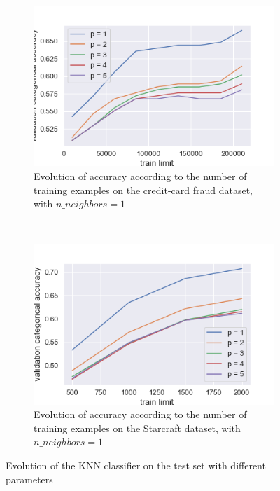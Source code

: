 \documentclass[10pt]{article}
\begin{document}
\begin{figure}
			\begin{subfigure}[]{0.45\columnwidth}
				\centering
				\includegraphics[width=\linewidth]{../graphics/knn_creditcard_train_limit.png}
				\caption{Evolution of accuracy according to the number of training examples on the credit-card fraud dataset, with $n\_neighbors=1$}
				\label{knn:knn_cc_train_limit}
			\end{subfigure}
			~
			\begin{subfigure}[]{0.45\columnwidth}
				\centering
				\includegraphics[width=\linewidth]{../graphics/knn_starcraft_train_limit.png}
				\caption{Evolution of accuracy according to the number of training examples on the Starcraft dataset, with $n\_neighbors=1$}
				\label{knn:knn_sc_train_limit}
			\end{subfigure}
			\caption{Evolution of the KNN classifier on the test set with different parameters}
			\label{knn:knn}
		\end{figure}
\end{document}
